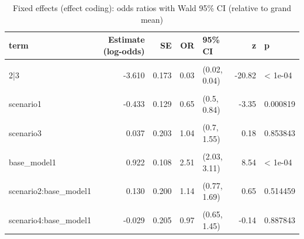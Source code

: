 \begin{table}[!h]
\centering
\caption{Fixed effects (effect coding): odds ratios with Wald 95\% CI (relative to grand mean)}
\centering
\begin{tabular}[t]{lrrrlrl}
\toprule
term & Estimate (log-odds) & SE & OR & 95\% CI & z & p\\
\midrule
\cellcolor{gray!10}{1|2} & \cellcolor{gray!10}{-5.848} & \cellcolor{gray!10}{0.456} & \cellcolor{gray!10}{0.00} & \cellcolor{gray!10}{(0, 0.01)} & \cellcolor{gray!10}{-12.82} & \cellcolor{gray!10}{< 1e-04}\\
2|3 & -3.610 & 0.173 & 0.03 & (0.02, 0.04) & -20.82 & < 1e-04\\
\cellcolor{gray!10}{3|4} & \cellcolor{gray!10}{1.715} & \cellcolor{gray!10}{0.112} & \cellcolor{gray!10}{5.56} & \cellcolor{gray!10}{(4.46, 6.92)} & \cellcolor{gray!10}{15.31} & \cellcolor{gray!10}{< 1e-04}\\
scenario1 & -0.433 & 0.129 & 0.65 & (0.5, 0.84) & -3.35 & 0.000819\\
\cellcolor{gray!10}{scenario2} & \cellcolor{gray!10}{0.233} & \cellcolor{gray!10}{0.200} & \cellcolor{gray!10}{1.26} & \cellcolor{gray!10}{(0.85, 1.87)} & \cellcolor{gray!10}{1.16} & \cellcolor{gray!10}{0.244253}\\
scenario3 & 0.037 & 0.203 & 1.04 & (0.7, 1.55) & 0.18 & 0.853843\\
\cellcolor{gray!10}{scenario4} & \cellcolor{gray!10}{-0.055} & \cellcolor{gray!10}{0.205} & \cellcolor{gray!10}{0.95} & \cellcolor{gray!10}{(0.63, 1.41)} & \cellcolor{gray!10}{-0.27} & \cellcolor{gray!10}{0.789937}\\
base\_model1 & 0.922 & 0.108 & 2.51 & (2.03, 3.11) & 8.54 & < 1e-04\\
\cellcolor{gray!10}{scenario1:base\_model1} & \cellcolor{gray!10}{-0.408} & \cellcolor{gray!10}{0.129} & \cellcolor{gray!10}{0.67} & \cellcolor{gray!10}{(0.52, 0.86)} & \cellcolor{gray!10}{-3.15} & \cellcolor{gray!10}{0.001623}\\
scenario2:base\_model1 & 0.130 & 0.200 & 1.14 & (0.77, 1.69) & 0.65 & 0.514459\\
\cellcolor{gray!10}{scenario3:base\_model1} & \cellcolor{gray!10}{0.063} & \cellcolor{gray!10}{0.203} & \cellcolor{gray!10}{1.07} & \cellcolor{gray!10}{(0.71, 1.59)} & \cellcolor{gray!10}{0.31} & \cellcolor{gray!10}{0.756363}\\
scenario4:base\_model1 & -0.029 & 0.205 & 0.97 & (0.65, 1.45) & -0.14 & 0.887843\\
\bottomrule
\end{tabular}
\end{table}
